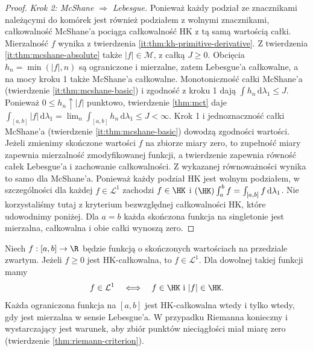 \begin{proof}
\emph{Krok 2: McShane $\Rightarrow$ Lebesgue.} Ponieważ każdy podział ze znacznikami należącymi do komórek jest również podziałem z wolnymi znacznikami, całkowalność McShane'a pociąga całkowalność HK z tą samą wartością całki. Mierzalność $f$ wynika z twierdzenia \ref{it:thm:kh-primitive-derivative}. Z twierdzenia \ref{it:thm:mcshane-absolute} także $|f|\in\mathcal M$, z całką $J\ge0$. Obcięcia $h_n=\min(|f|,n)$ są ograniczone i mierzalne, zatem Lebesgue'a całkowalne, a na mocy kroku 1 także McShane'a całkowalne. Monotoniczność całki McShane'a (twierdzenie \ref{it:thm:mcshane-basic}) i zgodność z kroku 1 dają $\int h_n\,\mathrm d\lambda_1\le J$. Ponieważ $0\le h_n\uparrow |f|$ punktowo, twierdzenie \ref{thm:mct} daje $\int_{[a,b]}|f|\,\mathrm d\lambda_1=\lim_n\int_{[a,b]}h_n\,\mathrm d\lambda_1\le J<\infty$. Krok 1 i jednoznaczność całki McShane'a
(twierdzenie \ref{it:thm:mcshane-basic})
dowodzą zgodności wartości. Jeżeli zmienimy
skończone wartości $f$ na zbiorze miary zero,
to zupełność miary zapewnia mierzalność zmodyfikowanej
funkcji, a twierdzenie 
zapewnia równość całek Lebesgue'a i zachowanie
całkowalności. Z wykazanej równoważności wynika to
samo dla McShane'a. Ponieważ każdy podział HK jest
wolnym podziałem, w szczególności dla każdej
$f\in\mathcal L^1$ zachodzi $f\in\HK$ i
$(\HK)\int_a^b f=\int_{[a,b]}f\,\mathrm d\lambda_1$.
Nie korzystaliśmy tutaj z kryterium bezwzględnej
całkowalności HK, które udowodnimy poniżej.
Dla $a=b$ każda skończona funkcja na singletonie
jest mierzalna, całkowalna i obie całki wynoszą zero.
\end{proof}
\begin{twierdzenie}\label{ma1:kh:thm:kh-absolute}\label{it:thm:hk-absolute-integrability}
Niech $f:[a,b]\to\R$ będzie funkcją o skończonych
wartościach na przedziale zwartym. Jeżeli $f\ge0$
jest HK-całkowalna, to $f\in\mathcal L^1$.
Dla dowolnej takiej funkcji mamy
\[
f\in\mathcal L^1\quad\Longleftrightarrow\quad f\in\HK\ \text{i}\ |f|\in\HK.
\]
Każda ograniczona funkcja na $[a,b]$ jest
HK-całkowalna wtedy i tylko wtedy, gdy jest
mierzalna w sensie Lebesgue'a. W przypadku Riemanna
konieczny i wystarczający jest warunek, aby zbiór
punktów nieciągłości miał miarę zero
(twierdzenie \ref{thm:riemann-criterion}).
\end{twierdzenie}
